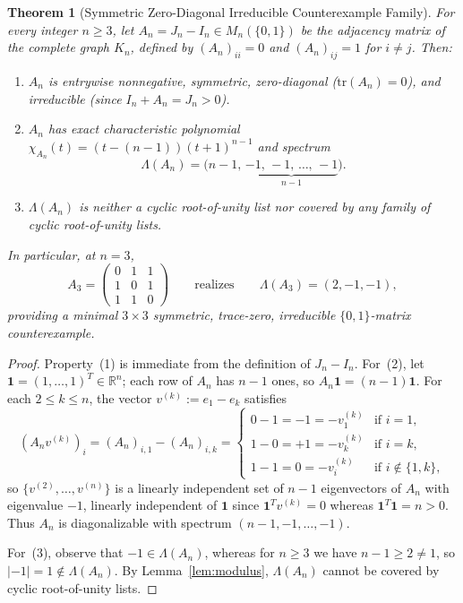 \documentclass[11pt]{article}
\newtheorem{theorem}{Theorem}[section]
\theoremstyle{definition}
\theoremstyle{remark}
\begin{document}
\begin{theorem}[Symmetric Zero-Diagonal Irreducible Counterexample Family]\label{thm:hollow}
For every integer $n \ge 3$, let $A_n = J_n - I_n \in M_n(\{0, 1\})$ be the adjacency
matrix of the complete graph $K_n$, defined by $(A_n)_{ii} = 0$ and $(A_n)_{ij} = 1$ for
$i \ne j$. Then:
\begin{enumerate}
  \item $A_n$ is entrywise nonnegative, symmetric, zero-diagonal ($\mathrm{tr}(A_n) = 0$),
    and irreducible (since $I_n + A_n = J_n > 0$).
  \item $A_n$ has exact characteristic polynomial
    $\chi_{A_n}(t) = (t - (n - 1))(t + 1)^{n - 1}$ and spectrum
    \[
      \Lambda(A_n) = \bigl(n - 1, \, \underbrace{-1, \, -1, \, \dots, \, -1}_{n - 1}\bigr).
    \]
  \item $\Lambda(A_n)$ is neither a cyclic root-of-unity list nor covered by any family of
    cyclic root-of-unity lists.
\end{enumerate}
In particular, at $n = 3$,
\[
  A_3 = \begin{pmatrix} 0 & 1 & 1 \\ 1 & 0 & 1 \\ 1 & 1 & 0 \end{pmatrix}
  \qquad\text{realizes}\qquad
  \Lambda(A_3) = (2, -1, -1),
\]
providing a minimal $3 \times 3$ symmetric, trace-zero, irreducible $\{0,1\}$-matrix
counterexample.
\end{theorem}

\begin{proof}
Property~(1) is immediate from the definition of $J_n - I_n$. For~(2), let $\mathbf{1} =
(1, \dots, 1)^T \in \mathbb{R}^n$; each row of $A_n$ has $n - 1$ ones, so $A_n \mathbf{1}
= (n - 1)\mathbf{1}$. For each $2 \le k \le n$, the vector $v^{(k)} := e_1 - e_k$ satisfies
\[
  (A_n v^{(k)})_i = (A_n)_{i,1} - (A_n)_{i,k} =
  \begin{cases}
    0 - 1 = -1 = -v^{(k)}_1 & \text{if } i = 1, \\
    1 - 0 = +1 = -v^{(k)}_k & \text{if } i = k, \\
    1 - 1 = 0 = -v^{(k)}_i & \text{if } i \notin \{1, k\},
  \end{cases}
\]
so $\{v^{(2)}, \dots, v^{(n)}\}$ is a linearly independent set of $n - 1$ eigenvectors of
$A_n$ with eigenvalue $-1$, linearly independent of $\mathbf{1}$ since $\mathbf{1}^T
v^{(k)} = 0$ whereas $\mathbf{1}^T \mathbf{1} = n > 0$. Thus $A_n$ is diagonalizable with
spectrum $(n - 1, -1, \dots, -1)$.

For~(3), observe that $-1 \in \Lambda(A_n)$, whereas for $n \ge 3$ we have $n - 1 \ge 2
\ne 1$, so $|-1| = 1 \notin \Lambda(A_n)$. By Lemma~\ref{lem:modulus}, $\Lambda(A_n)$
cannot be covered by cyclic root-of-unity lists.
\end{proof}
\end{document}
